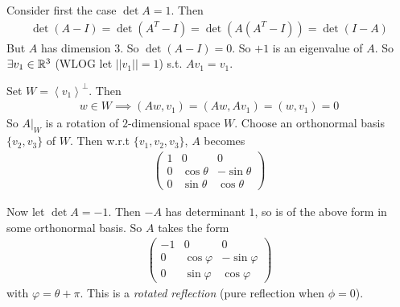 \documentclass[a4paper]{article}
\begin{document}
Consider first the case $\det A = 1$. Then
\begin{equation*}
\begin{aligned}
\det(A-I) = \det(A^T-I) = \det(A(A^T-I)) = \det(I-A)
\end{aligned}
\end{equation*}
But $A$ has dimension 3. So $\det(A-I)=0$. So $+1$ is an eigenvalue of $A$. So $\exists v_1 \in \mathbb{R}^3$ (WLOG let $||v_1|| = 1$) s.t. $Av_1 = v_1$.

Set $W = \left<v_1\right>^\perp$. Then
\begin{equation*}
\begin{aligned}
w \in W \implies (Aw,v_1)=(Aw,Av_1) = (w,v_1) = 0
\end{aligned}
\end{equation*} 
So $A|_W$ is a rotation of $2$-dimensional space $W$. Choose an orthonormal basis $\{v_2,v_3\}$ of $W$. Then w.r.t $\{v_1,v_2,v_3\}$, $A$ becomes
\begin{equation*}
\begin{aligned}
\left(\begin{matrix}
1 & 0 & 0\\
0 & \cos\theta & -\sin\theta\\
0 & \sin\theta & \cos\theta
\end{matrix}\right)
\end{aligned}
\end{equation*}

Now let $\det A = -1$. Then $-A$ has determinant $1$, so is of the above form in some orthonormal basis. So $A$ takes the form
\begin{equation*}
\begin{aligned}
\left(\begin{matrix}
-1 & 0 & 0\\
0 & \cos\varphi & -\sin\varphi\\
0 & \sin\varphi & \cos\varphi
\end{matrix}\right)
\end{aligned}
\end{equation*}
with $\varphi = \theta + \pi$. This is a \emph{rotated reflection} (pure reflection when $\phi = 0$).
\end{document}

